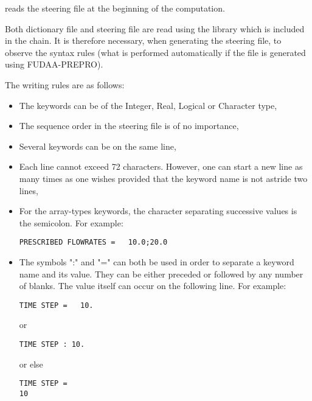  reads the steering file at the beginning of the computation.

Both dictionary file and steering file are read using the 
library which is included in the \tel chain. It is therefore necessary,
when generating the steering file, to observe the  syntax
rules (what is performed automatically if the file is generated using
FUDAA-PREPRO).

The writing rules are as follows:

\begin{itemize}
\item The keywords can be of the Integer, Real, Logical or Character type,

\item The sequence order in the steering file is of no importance,

\item Several keywords can be on the same line,

\item Each line cannot exceed 72 characters. However, one can start a new line
as many times as one wishes provided that the keyword name is not astride two
lines,

\item For the array-types keywords, the character separating successive values
is the semicolon. For example:

\begin{lstlisting}[language=TelemacCas]
PRESCRIBED FLOWRATES =   10.0;20.0
\end{lstlisting}

\item The symbols ":" and "=" can both be used in order to separate a keyword
name and its value. They can be either preceded or followed by any number of
blanks. The value itself can occur on the following line. For example:

\begin{lstlisting}[language=TelemacCas]
TIME STEP =   10.
\end{lstlisting}

or

\begin{lstlisting}[language=TelemacCas]
TIME STEP : 10.
\end{lstlisting}

or else

\begin{lstlisting}[language=TelemacCas]
TIME STEP =
10
\end{lstlisting}


\end{itemize}
